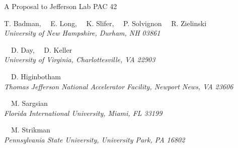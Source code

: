 \begin{center}
A Proposal to Jefferson Lab PAC 42

\vspace{1.5cm}

\setcounter{footnote}{\SPOKES}
%
{T. Badman,
~~E. Long,\setcounter{footnote}{\SPOKES}
\setcounter{footnote}{\SPOKES}\footnotemark {}
\setcounter{footnote}{\CONTACT}\footnotemark{}
~~K. Slifer,\setcounter{footnote}{\SPOKES}\footnotemark
~~P. Solvignon\setcounter{footnote}{\SPOKES}\footnotemark
~~R. Zielinski
}\\
\ls
{\normalsize\it{University of New Hampshire, Durham, NH 03861}}

\vspace{10px}

{~~D. Day,\setcounter{footnote}{\SPOKES}\footnotemark
~~D. Keller\setcounter{footnote}{\SPOKES}\footnotemark}\\
\ls
{\normalsize\it{University of Virginia, Charlottesville, VA 22903}}

\vspace{10px}

{~~D. Higinbotham\setcounter{footnote}{\SPOKES}\footnotemark}\\
\ls
{\normalsize\it{Thomas Jefferson National Accelerator Facility, Newport News, VA 23606}}

\vspace{10px}

{~~M. Sargsian}\\
\ls
{\normalsize\it{Florida International University, Miami, FL 33199}}

\vspace{10px}

{~~M. Strikman}\\
\ls
{\normalsize\it{Pennsylvania State University, University Park, PA 16802}}
\ks
%

\end{center}


\setcounter{footnote}{0}
